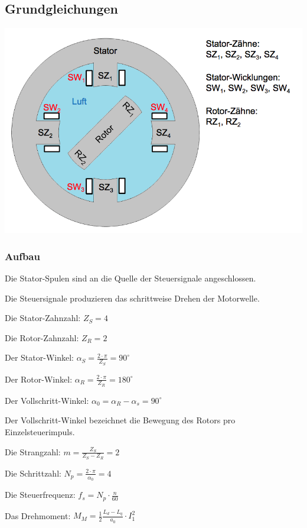 \subsection{Grundgleichungen}
\begin{minipage}{0.5 \linewidth}
\includegraphics[width = \linewidth]{./Pics/VL67/AufbauRe}
\end{minipage}
\begin{minipage}{0.5 \linewidth}
\subsubsection{Aufbau}
\begin{compactitem}
\item Die Stator-Spulen sind an die Quelle der Steuersignale angeschlossen.
\item Die Steuersignale produzieren das schrittweise Drehen der Motorwelle.
\item Die Stator-Zahnzahl: $Z_S = 4$
\item Die Rotor-Zahnzahl: $Z_R = 2$
\item Der Stator-Winkel: $\alpha_S = \frac{2\cdot \pi}{Z_S} = 90^\circ$
\item Der Rotor-Winkel: $\alpha_R =  \frac{2\cdot \pi}{Z_R} = 180^\circ$
\item Der Vollschritt-Winkel: $\alpha_0 = \alpha_R - \alpha_s = 90^\circ$ 
\item Der Vollschritt-Winkel bezeichnet die Bewegung des Rotors pro Einzelsteuerimpuls.
\item Die Strangzahl: $m = \frac{Z_S}{Z_S - Z_R} = 2$
\item Die Schrittzahl: $N_p = \frac{2\cdot \pi}{\alpha_0} = 4$
\item Die Steuerfrequenz: $f_s = N_p \cdot \frac{n}{60}$ 
\item Das Drehmoment: $M_M = \frac{1}{2} \frac{L_d-L_q}{a_0} \cdot I^2_1$
\end{compactitem}
\end{minipage}

